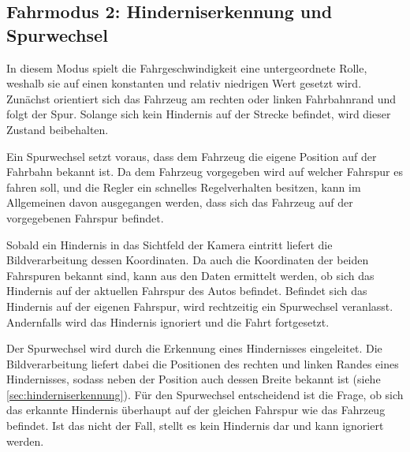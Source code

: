 \subsection{Fahrmodus 2: Hinderniserkennung und Spurwechsel}

In diesem Modus spielt die Fahrgeschwindigkeit eine untergeordnete Rolle, weshalb sie auf einen konstanten und relativ niedrigen Wert gesetzt wird. Zunächst orientiert sich das Fahrzeug am rechten oder linken Fahrbahnrand und folgt der Spur. Solange sich kein Hindernis auf der Strecke befindet, wird dieser Zustand beibehalten. 

Ein Spurwechsel setzt voraus, dass dem Fahrzeug die eigene Position auf der Fahrbahn bekannt ist. Da dem Fahrzeug vorgegeben wird auf welcher Fahrspur es fahren soll, und die Regler ein schnelles Regelverhalten besitzen, kann im Allgemeinen davon ausgegangen werden, dass sich das Fahrzeug auf der vorgegebenen Fahrspur befindet.

Sobald ein Hindernis in das Sichtfeld der Kamera eintritt liefert die Bildverarbeitung dessen Koordinaten. Da auch die Koordinaten der beiden Fahrspuren bekannt sind, kann aus den Daten ermittelt werden, ob sich das Hindernis auf der aktuellen Fahrspur des Autos befindet. Befindet sich das Hindernis auf der eigenen Fahrspur, wird rechtzeitig ein Spurwechsel veranlasst. Andernfalls wird das Hindernis ignoriert und die Fahrt fortgesetzt.

Der Spurwechsel wird durch die Erkennung eines Hindernisses eingeleitet. Die Bildverarbeitung liefert dabei die Positionen des rechten und linken Randes eines Hindernisses, sodass neben der Position auch dessen Breite bekannt ist (siehe \ref{sec:hinderniserkennung}). Für den Spurwechsel entscheidend ist die Frage, ob sich das erkannte Hindernis überhaupt auf der gleichen Fahrspur wie das Fahrzeug befindet. Ist das nicht der Fall, stellt es kein Hindernis dar und kann ignoriert werden.


